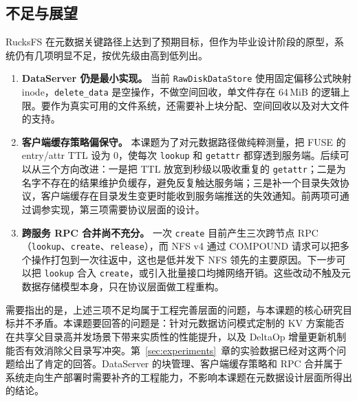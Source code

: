 \subsection{不足与展望}

RucksFS 在元数据关键路径上达到了预期目标，但作为毕业设计阶段的原型，系统仍有几项明显不足，按优先级由高到低列出。

\begin{enumerate}
    \item \textbf{DataServer 仍是最小实现。} 当前 \texttt{RawDiskDataStore} 使用固定偏移公式映射 inode，\texttt{delete\_data} 是空操作，不做空间回收，单文件存在 64\,MiB 的逻辑上限。要作为真实可用的文件系统，还需要补上块分配、空间回收以及对大文件的支持。

    \item \textbf{客户端缓存策略偏保守。} 本课题为了对元数据路径做纯粹测量，把 FUSE 的 entry/attr TTL 设为 0，使每次 \texttt{lookup} 和 \texttt{getattr} 都穿透到服务端。后续可以从三个方向改进：一是把 TTL 放宽到秒级以吸收重复的 \texttt{getattr}；二是为名字不存在的结果维护负缓存，避免反复触达服务端；三是补一个目录失效协议，客户端缓存在目录发生变更时能收到服务端推送的失效通知。前两项可通过调参实现，第三项需要协议层面的设计。

    \item \textbf{跨服务 RPC 合并尚不充分。} 一次 \texttt{create} 目前产生三次跨节点 RPC（\texttt{lookup}、\texttt{create}、\texttt{release}），而 NFS v4 通过 COMPOUND 请求可以把多个操作打包到一次往返中，这也是低并发下 NFS 领先的主要原因。下一步可以把 \texttt{lookup} 合入 \texttt{create}，或引入批量接口均摊网络开销。这些改动不触及元数据存储模型本身，只在协议层面做工程重构。
\end{enumerate}

需要指出的是，上述三项不足均属于工程完善层面的问题，与本课题的核心研究目标并不矛盾。本课题要回答的问题是：针对元数据访问模式定制的 KV 方案能否在共享父目录高并发场景下带来实质性的性能提升，以及 DeltaOp 增量更新机制能否有效消除父目录写冲突。第~\ref{sec:experiments}~章的实验数据已经对这两个问题给出了肯定的回答。DataServer 的块管理、客户端缓存策略和 RPC 合并属于系统走向生产部署时需要补齐的工程能力，不影响本课题在元数据设计层面所得出的结论。


